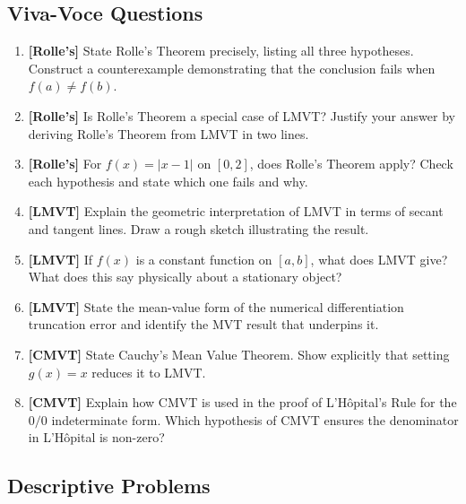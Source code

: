 \documentclass[12pt,a4paper]{article}
\begin{document}
\subsection*{Viva-Voce Questions}

\begin{enumerate}
  \item \textbf{[Rolle's]} State Rolle's Theorem precisely, listing all three hypotheses.
        Construct a counterexample demonstrating that the conclusion fails when $f(a) \neq f(b)$.

  \item \textbf{[Rolle's]} Is Rolle's Theorem a special case of LMVT? Justify your answer by
        deriving Rolle's Theorem from LMVT in two lines.

  \item \textbf{[Rolle's]} For $f(x) = |x-1|$ on $[0,2]$, does Rolle's Theorem apply?
        Check each hypothesis and state which one fails and why.

  \item \textbf{[LMVT]} Explain the geometric interpretation of LMVT in terms of secant and
        tangent lines. Draw a rough sketch illustrating the result.

  \item \textbf{[LMVT]} If $f(x)$ is a constant function on $[a,b]$, what does LMVT give?
        What does this say physically about a stationary object?

  \item \textbf{[LMVT]} State the mean-value form of the numerical differentiation truncation error
        and identify the MVT result that underpins it.

  \item \textbf{[CMVT]} State Cauchy's Mean Value Theorem. Show explicitly that setting $g(x) = x$
        reduces it to LMVT.

  \item \textbf{[CMVT]} Explain how CMVT is used in the proof of L'H\^{o}pital's Rule for the
        $0/0$ indeterminate form. Which hypothesis of CMVT ensures the denominator in
        L'H\^{o}pital is non-zero?
\end{enumerate}

\subsection*{Descriptive Problems}
\end{document}
